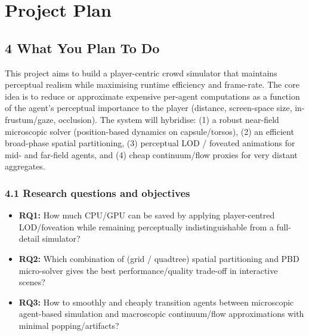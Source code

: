 
\section{Project Plan}
\subsection{4 What You Plan To Do}
This project aims to build a player-centric crowd simulator that maintains perceptual realism while maximising runtime 
efficiency and frame-rate. The core idea is to reduce or approximate expensive per-agent computations as a function of the 
agent's perceptual importance to the player (distance, screen-space size, in-frustum/gaze, occlusion). The system will hybridise: 
(1) a robust near-field microscopic solver (position-based dynamics on capsule/torsos), 
(2) an efficient broad-phase spatial partitioning, 
(3) perceptual LOD / foveated animations for mid- and far-field agents, and 
(4) cheap continuum/flow proxies for very distant aggregates.

\subsubsection{4.1 Research questions and objectives}
\begin{itemize}[itemsep=0pt]
  \item \textbf{RQ1:} How much CPU/GPU can be saved by applying player-centred LOD/foveation while remaining perceptually indistinguishable from a full-detail simulator?
  \item \textbf{RQ2:} Which combination of (grid / quadtree) spatial partitioning and PBD micro-solver gives the best performance/quality trade-off in interactive scenes?
  \item \textbf{RQ3:} How to smoothly and cheaply transition agents between microscopic agent-based simulation and macroscopic continuum/flow approximations with minimal popping/artifacts?
\end{itemize}

